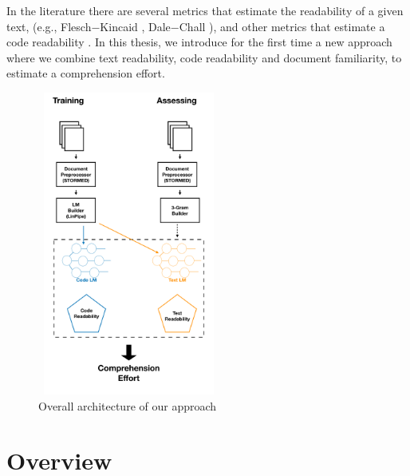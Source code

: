 \documentclass[12pt,mscthesis]{usiinfthesis}
\begin{document}
    In the literature there are several metrics that estimate the readability of a given text, (e.g., Flesch$-$Kincaid \cite{Kincaid}, Dale$-$Chall \cite{Dale-Chall}), and other metrics that estimate a code readability \cite{Buse:2010:LMC:1850489.1850615}. In this thesis, we introduce for the first time a new approach where we combine text readability, code readability and document familiarity, to estimate a comprehension effort.\\

	
	
	\begin{figure}[H]
	\centering
	\includegraphics[width=6cm, height=10cm]{overview}
	\caption{Overall architecture of our approach}
	\label{overview}
	\end{figure}
	
	\section{Overview}
\end{document}
